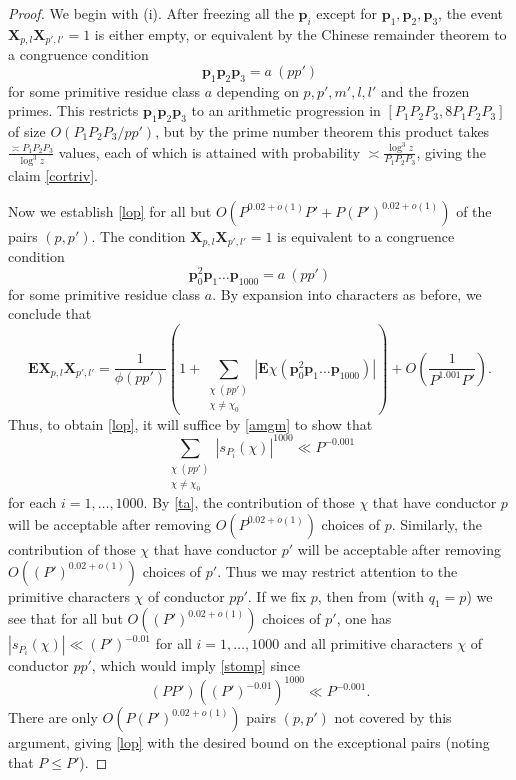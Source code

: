 \documentclass[12pt]{amsart}
\newcommand{\E}{\mathbf{E}}
\begin{document}
\begin{proof}
    We begin with (i). After freezing all the $\mathbf{p}_i$ except for $\mathbf{p}_1, \mathbf{p}_2, \mathbf{p}_3$, the event $\mathbf{X}_{p,l} \mathbf{X}_{p',l'}=1$ is either empty, or equivalent by the Chinese remainder theorem to a congruence condition
$$ \mathbf{p}_1 \mathbf{p}_2 \mathbf{p}_3 = a\ (p p')$$
for some primitive residue class $a$ depending on $p, p', m', l, l'$ and the frozen primes.  This restricts $\mathbf{p}_1 \mathbf{p}_2 \mathbf{p}_3$ to an arithmetic progression in $[P_1P_2P_3, 8P_1P_2P_3]$ of size $O(P_1 P_2 P_3 / pp')$, but by the prime number theorem this product takes $\frac{\asymp P_1 P_2 P_3 }{ \log^3 z}$ values, each of which is attained with probability $\asymp \frac{\log^3 z}{P_1 P_2 P_3}$, giving the claim \eqref{cortriv}.

Now we establish \eqref{lop} for all but $O(P^{0.02+o(1)} P' + P (P')^{0.02+o(1)})$ of  the pairs $(p,p')$.  The condition $\mathbf{X}_{p,l} \mathbf{X}_{p',l'}=1$ is equivalent to a congruence condition
$$ \mathbf{p}_{0}^2 \mathbf{p}_{1} \dots \mathbf{p}_{1000} = a\ (pp')$$
for some primitive residue class $a$.  By expansion into characters as before, we conclude that
$$ \E \mathbf{X}_{p,l} \mathbf{X}_{p',l'} = \frac{1}{\phi(pp')} \left( 1 + \sum_{\substack{\chi\ (pp') \\ \chi \neq \chi_0}} |\E \chi(\mathbf{p}_{0}^2 \mathbf{p}_{1} \dots \mathbf{p}_{1000})| \right) + O\left( \frac{1}{P^{1.001} P'}\right).$$
Thus, to obtain \eqref{lop}, it will suffice by \eqref{amgm} to show that
\begin{equation}\label{stomp}
 \sum_{\substack{\chi\ (pp') \\ \chi \neq \chi_0}} |s_{P_i}(\chi)|^{1000} \ll P^{-0.001}
\end{equation}
for each $i=1,\dots,1000$.
By \eqref{ta}, the contribution of those $\chi$ that have conductor $p$ will be acceptable after removing $O(P^{0.02+o(1)})$ choices of $p$.  Similarly, the contribution of those $\chi$ that have conductor $p'$ will be acceptable after removing $O((P')^{0.02+o(1)})$ choices of $p'$.  Thus we may restrict attention to the primitive characters $\chi$ of conductor $pp'$. If we fix $p$, then from  (with $q_1=p$) we see that for all but $O((P')^{0.02+o(1)})$ choices of $p'$, one has $|s_{P_i}(\chi)| \ll (P')^{-0.01}$ for all $i=1,\dots,1000$ and all primitive characters $\chi$ of conductor $pp'$, which would imply \eqref{stomp} since
$$ (PP') ((P')^{-0.01})^{1000} \ll P^{-0.001}.$$
There are only $O(P (P')^{0.02+o(1)})$ pairs $(p,p')$ not covered by this argument, giving \eqref{lop} with the desired bound on the exceptional pairs (noting that $P \leq P'$).
\end{proof}
\end{document}

